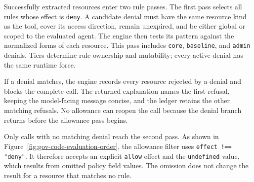 Successfully extracted resources enter two rule passes. The first pass selects
all rules whose effect is \texttt{deny}. A candidate denial must have the same
resource kind as the tool, cover its access direction, remain unexpired, and
be either global or scoped to the evaluated agent. The engine then tests its
pattern against the normalized forms of each resource. This pass includes
\texttt{core}, \texttt{baseline}, and \texttt{admin} denials. Tiers determine
rule ownership and mutability; every active denial has the same runtime force.

If a denial matches, the engine records every resource rejected by a denial
and blocks the complete call. The returned explanation names the first
refusal, keeping the model-facing message concise, and the ledger retains the
other matching refusals. No allowance can reopen the call because the denial
branch returns before the allowance pass begins.

Only calls with no matching denial reach the second pass. As shown in
Figure~\ref{fig:gov-code-evaluation-order}, the allowance filter uses
\texttt{effect !== "deny"}. It therefore accepts an explicit
\texttt{allow} effect and the \texttt{undefined} value, which results from omitted policy field values. The omission does not change the result for a resource that
matches no rule.

